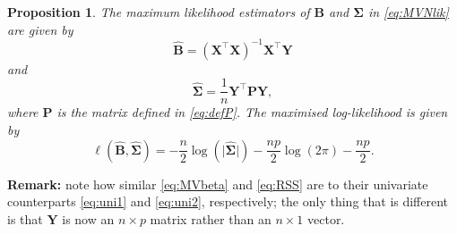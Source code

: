 \documentclass[]{book}
\newtheorem{proposition}{Proposition}[chapter]
\theoremstyle{definition}
\theoremstyle{definition}
\theoremstyle{definition}
\theoremstyle{remark}
\begin{document}
\begin{proposition}
\protect\hypertarget{prp:eight1}{}{\label{prp:eight1} }The maximum likelihood estimators of \(\boldsymbol B\) and \(\boldsymbol \Sigma\) in \eqref{eq:MVNlik}
are given by
\begin{equation}
\hat{\boldsymbol B}= (\boldsymbol X^\top \boldsymbol X)^{-1}\boldsymbol X^\top \boldsymbol Y
\label{eq:MVbeta}
\end{equation}
and
\begin{equation}
\hat{\boldsymbol \Sigma}=\frac{1}{n}\boldsymbol Y^\top \boldsymbol P\boldsymbol Y,
\label{eq:RSS}
\end{equation}
where \(\boldsymbol P\) is the matrix defined in \eqref{eq:defP}. The maximised log-likelihood is given by
\begin{equation}
\ell(\hat{\boldsymbol B}, \hat{\boldsymbol \Sigma})=- \frac{n}{2} \log(\vert \hat{\boldsymbol \Sigma} \vert )-\frac{np}{2}\log(2\pi) -\frac{np}{2}.
\label{eq:maxlik}
\end{equation}
\end{proposition}

\textbf{Remark:} note how similar \eqref{eq:MVbeta} and \eqref{eq:RSS} are to their univariate counterparts \eqref{eq:uni1} and \eqref{eq:uni2}, respectively; the only thing that is different is that \(\boldsymbol Y\) is now an \(n \times p\) matrix rather than an \(n \times 1\) vector.
\end{document}
